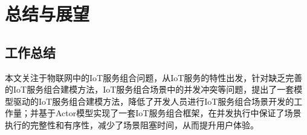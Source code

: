 \documentclass[winfonts,master,twoside]{njuthesis}
\begin{document}
    

\chapter{总结与展望}
\section{工作总结}
本文关注于物联网中的IoT服务组合问题，从IoT服务的特性出发，针对缺乏完善的IoT服务组合建模方法，IoT服务组合场景中的并发冲突等问题，提出了一套模型驱动的IoT服务组合建模方法，降低了开发人员进行IoT服务组合场景开发的工作量；并基于Actor模型实现了一套IoT服务组合框架，在并发执行中保证了场景执行的完整性和有序性，减少了场景阻塞时间，从而提升用户体验。
\end{document}
